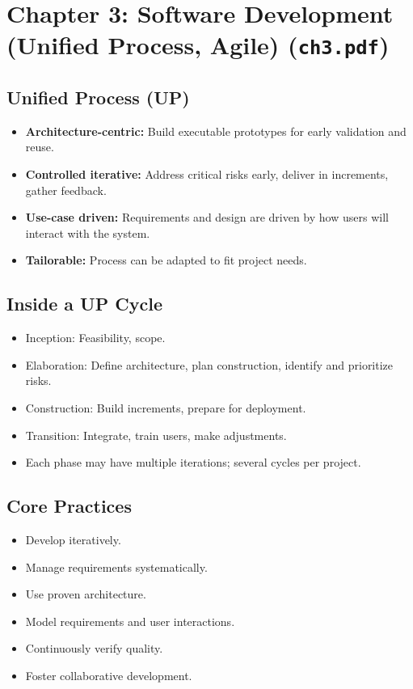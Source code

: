 \documentclass[11pt,a4paper]{article}
\begin{document}
\section{Chapter 3: Software Development (Unified Process, Agile) (\texttt{ch3.pdf})}

\subsection*{Unified Process (UP)}
\begin{itemize}
    \item \textbf{Architecture-centric:} Build executable prototypes for early validation and reuse.
    \item \textbf{Controlled iterative:} Address critical risks early, deliver in increments, gather feedback.
    \item \textbf{Use-case driven:} Requirements and design are driven by how users will interact with the system.
    \item \textbf{Tailorable:} Process can be adapted to fit project needs.
\end{itemize}

\subsection*{Inside a UP Cycle}
\begin{itemize}
    \item Inception: Feasibility, scope.
    \item Elaboration: Define architecture, plan construction, identify and prioritize risks.
    \item Construction: Build increments, prepare for deployment.
    \item Transition: Integrate, train users, make adjustments.
    \item Each phase may have multiple iterations; several cycles per project.
\end{itemize}

\subsection*{Core Practices}
\begin{itemize}
    \item Develop iteratively.
    \item Manage requirements systematically.
    \item Use proven architecture.
    \item Model requirements and user interactions.
    \item Continuously verify quality.
    \item Foster collaborative development.
\end{itemize}
\end{document}
